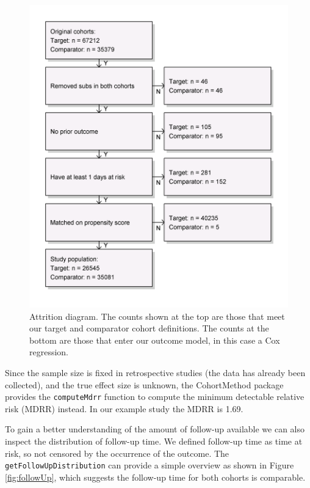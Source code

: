 \documentclass[]{book}
\begin{document}
\begin{figure}

{\centering \includegraphics[width=0.7\linewidth]{images/PopulationLevelEstimation/attrition} 

}

\caption{Attrition diagram. The counts shown at the top are those that meet our target and comparator cohort definitions. The counts at the bottom are those that enter our outcome model, in  this case a Cox regression.}\label{fig:attrition}
\end{figure}

Since the sample size is fixed in retrospective studies (the data has
already been collected), and the true effect size is unknown, the
CohortMethod package provides the \texttt{computeMdrr} function to
compute the minimum detectable relative risk (MDRR) instead. In our
example study the MDRR is 1.69.

To gain a better understanding of the amount of follow-up available we
can also inspect the distribution of follow-up time. We defined
follow-up time as time at risk, so not censored by the occurrence of the
outcome. The \texttt{getFollowUpDistribution} can provide a simple
overview as shown in Figure \ref{fig:followUp}, which suggests the
follow-up time for both cohorts is comparable.
\end{document}
